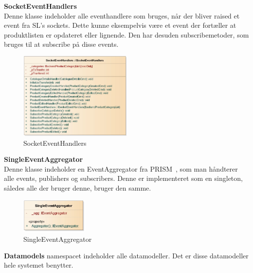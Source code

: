 \textbf{SocketEventHandlers}\\
Denne klasse indeholder alle eventhandlere som bruges, når der bliver raised et event fra \gls{SL}'s sockets. Dette kunne eksempelvis være et event der fortæller at produktlisten er opdateret eller lignende. Den har desuden subscribemetoder, som bruges til at subscribe på disse events.
\begin{center}
\begin{figure}[!h]
    \centering
    \includegraphics[width=0.50\textwidth]{Systemdesign/backend/klassebeskrivelser/Images/SocketEvents.png}
    \caption{SocketEventHandlers}
    \label{fig:SocketEventHandlers}
\end{figure}
\end{center}
\label{SocketEventHandlerBeskrivelse}
 \bigskip 
 
 
\textbf{SingleEventAggregator}\\
Denne klasse indeholder en EventAggregator fra PRISM~\cite{PRISM}, som man håndterer alle events, publishers og subscribers. Denne er implementeret som en singleton, således alle der bruger denne, bruger den samme.
\begin{center}
\begin{figure}[!h]
    \centering
    \includegraphics[width=0.30\textwidth]{Systemdesign/backend/klassebeskrivelser/Images/agg.png}
    \caption{SingleEventAggregator}
    \label{fig:SingleEventAggregator}
\end{figure}
\end{center}
\label{SingleEventAggregator_Beskrivelse}
 \bigskip 

\bigskip
\bigskip

\textbf{Datamodels} namespacet indeholder alle datamodeller. Det er disse datamodeller hele systemet benytter.\\
\bigskip

